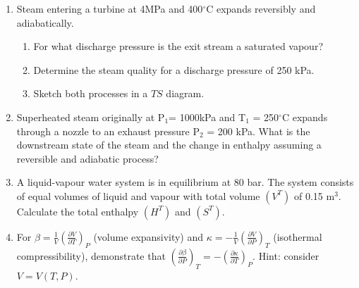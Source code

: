 \documentclass[12pts,a4paper,amsmath,amssymb,floatfix]{article}%
\newcommand{\frc}{\displaystyle\frac}
\begin{document}
\begin{enumerate}[label=\bfseries Problem \arabic*:]

\item\label{Tut04:Steam1} Steam entering a turbine at 4MPa and 400$^{\circ}$C expands reversibly and adiabatically.
\begin{enumerate}
\item For what discharge pressure is the exit stream a saturated vapour?
\item Determine the steam quality for a discharge pressure of 250 kPa.
\item Sketch both processes in a $TS$ diagram.
\end{enumerate}

\item\label{Tut04:Steam2} Superheated steam originally at P$_{1}$= 1000kPa and T$_{1}$ = 250$^{\circ}$C expands through a nozzle to an exhaust pressure P$_{2}$ =  200 kPa. What is the downstream state of the steam and the change in enthalpy assuming a reversible and adiabatic process?

\item\label{solutions} A liquid-vapour water system is in equilibrium at 80 bar. The system consists of equal volumes of liquid and vapour with total volume $\left(V^{T}\right)$ of 0.15 m$^{3}$. Calculate the total enthalpy $\left(H^{T}\right)$ and $\left(S^{T}\right)$. 

\item\label{prove} For $\beta = \frc{1}{V}\left(\frc{\partial V}{\partial T}\right)_{P}$ (volume expansivity) and $\kappa = -\frc{1}{V}\left(\frc{\partial V}{\partial P}\right)_{T}$ (isothermal compressibility), demonstrate that $\left(\frc{\partial\beta}{\partial P}\right)_{T} = -\left(\frc{\partial\kappa}{\partial T}\right)_{P}$. Hint: consider $V=V\left(T,P\right)$.


\end{enumerate}
\end{document}
